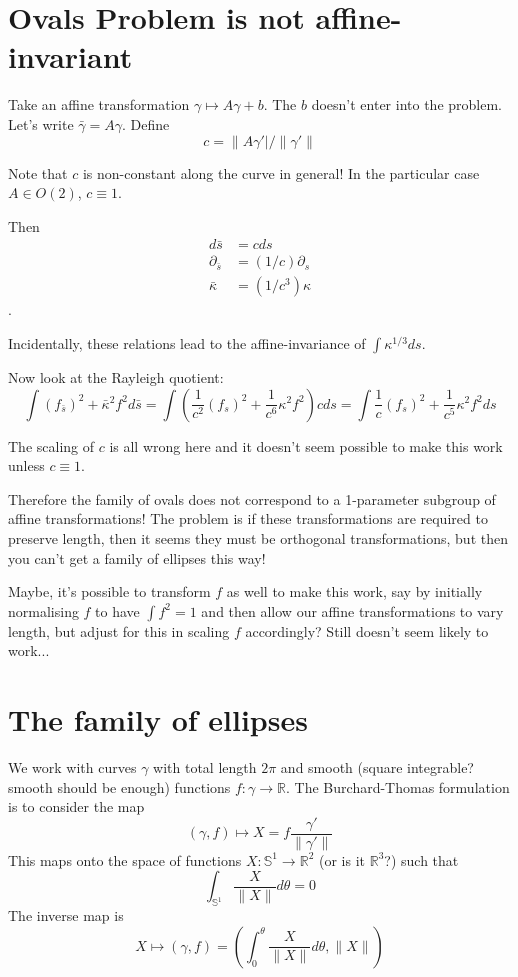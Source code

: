 \documentclass{amsart}
\begin{document}

\section*{Ovals Problem is not affine-invariant}

Take an affine transformation \(\gamma \mapsto A \gamma + b\). The \(b\) doesn't enter into the problem. Let's write \(\bar{\gamma} = A \gamma\). Define
\[
c = \|A\gamma'|/\|\gamma'\|
\]

Note that \(c\) is non-constant along the curve in general! In the particular case \(A \in O(2)\), \(c \equiv 1\).

Then 
\begin{align}
d\bar{s} &= c ds \\
\partial_{\bar{s}} &= (1/c) \partial_s \\ 
\bar{\kappa} &= (1/c^3) \kappa
\end{align}.

Incidentally, these relations lead to the affine-invariance of \(\int \kappa^{1/3} ds\).

Now look at the Rayleigh quotient:
\[
\int (f_{\bar{s}})^2 + \bar{\kappa}^2 f^2 d\bar{s} = \int \left(\frac{1}{c^2} (f_s)^2 + \frac{1}{c^6} \kappa^2 f^2\right) c ds = \int \frac{1}{c} (f_s)^2 + \frac{1}{c^5} \kappa^2 f^2 ds
\]

The scaling of \(c\) is all wrong here and it doesn't seem possible to make this work unless \(c \equiv 1\). 

Therefore the family of ovals does not correspond to a 1-parameter subgroup of affine transformations! The problem is if these transformations are required to preserve length, then it seems they must be orthogonal transformations, but then you can't get a family of ellipses this way!

Maybe, it's possible to transform \(f\) as well to make this work, say by initially normalising \(f\) to have \(\int f^2 = 1\) and then allow our affine transformations to vary length, but adjust for this in scaling \(f\) accordingly? Still doesn't seem likely to work...
\section*{The family of ellipses}

We work with curves \(\gamma\) with total length \(2\pi\) and smooth (square integrable? smooth should be enough) functions \(f: \gamma \to \mathbb{R}\). The Burchard-Thomas formulation is to consider the map
\[
(\gamma, f) \mapsto X = f \frac{\gamma'}{\|\gamma'\|}
\]
This maps onto the space of functions \(X: \mathbb{S}^1 \to \mathbb{R}^2\) (or is it \(\mathbb{R}^3\)?) such that
\[
\int_{\mathbb{S}^1} \frac{X}{\|X\|} d\theta = 0
\]
The inverse map is
\[
X \mapsto (\gamma, f) = \left(\int_0^{\theta} \frac{X}{\|X\|} d\theta, \|X\|\right)
\]
\end{document}
